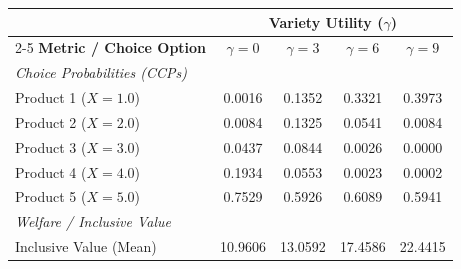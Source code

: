 \begin{tabular}{l cccc}
    \toprule
    & \multicolumn{4}{c}{\textbf{Variety Utility ($\gamma$)}} \\
    \cmidrule(lr){2-5}
    \textbf{Metric / Choice Option} & $\gamma = 0$ & $\gamma = 3$ & $\gamma = 6$ & $\gamma = 9$ \\
    \midrule
    \multicolumn{5}{l}{\textit{Choice Probabilities (CCPs)}} \\
    \hspace{1em} Product 1 ($X = 1.0$) & 0.0016 & 0.1352 & 0.3321 & 0.3973 \\
    \hspace{1em} Product 2 ($X = 2.0$) & 0.0084 & 0.1325 & 0.0541 & 0.0084 \\
    \hspace{1em} Product 3 ($X = 3.0$) & 0.0437 & 0.0844 & 0.0026 & 0.0000 \\
    \hspace{1em} Product 4 ($X = 4.0$) & 0.1934 & 0.0553 & 0.0023 & 0.0002 \\
    \hspace{1em} Product 5 ($X = 5.0$) & 0.7529 & 0.5926 & 0.6089 & 0.5941 \\
    \midrule
    \multicolumn{5}{l}{\textit{Welfare / Inclusive Value}} \\
    \hspace{1em} Inclusive Value (Mean) & 10.9606 & 13.0592 & 17.4586 & 22.4415 \\
    \bottomrule
  \end{tabular}
